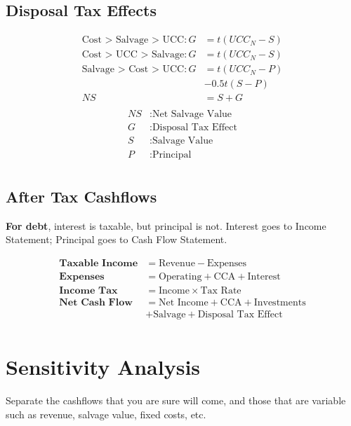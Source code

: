 \documentclass[landscape, letterpaper, 10pt]{article}
\begin{document}
\begin{multicols}{3}
    \subsection*{Disposal Tax Effects}
    \begin{align*}
        \text{Cost > Salvage > UCC}: G & = t(UCC_N - S) \\
        \text{Cost > UCC > Salvage}: G & = t(UCC_N - S) \\
        \text{Salvage > Cost > UCC}: G & = t(UCC_N - P) \\
                                       & - 0.5t(S-P)    \\
        NS                             & = S + G        \\
    \end{align*}
    \begin{align*}
        NS & : \text{Net Salvage Value}   \\
        G  & : \text{Disposal Tax Effect} \\
        S  & : \text{Salvage Value}       \\
        P  & : \text{Principal}           \\
    \end{align*}
    \subsection*{After Tax Cashflows}

    \textbf{For debt}, interest is taxable, but principal is not. Interest goes to Income Statement; Principal goes to Cash Flow Statement.

    \begin{align*}
        \textbf{Taxable Income} & = \text{Revenue} - \text{Expenses}                   \\
        \textbf{Expenses}       & =  \text{Operating} + \text{CCA} + \text{Interest}   \\
        \textbf{Income Tax}     & = \text{Income} \times \text{Tax Rate}               \\
        \textbf{Net Cash Flow}  & = \text{Net Income} + \text{CCA} +\text{Investments} \\
                                & +\text{Salvage} +\text{Disposal Tax Effect}          \\
    \end{align*}

    \section*{Sensitivity Analysis}
    Separate the cashflows that you are sure will come, and those that are variable such as revenue, salvage value, fixed costs, etc.

\end{multicols}
\end{document}
